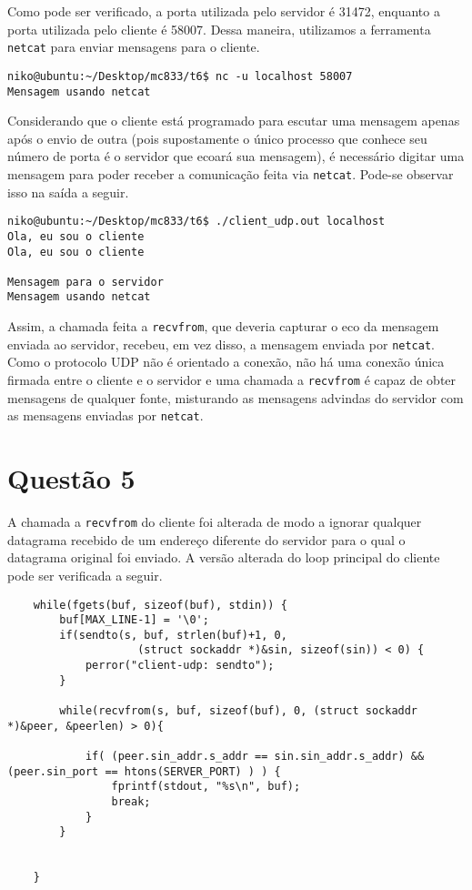 \documentclass[a4paper,10pt]{article}
\begin{document}
Como pode ser verificado, a porta utilizada pelo servidor é 31472, enquanto a porta utilizada pelo cliente é 58007. Dessa maneira, utilizamos a ferramenta {\tt netcat} para enviar mensagens para o cliente.

\begin{lstlisting}
niko@ubuntu:~/Desktop/mc833/t6$ nc -u localhost 58007
Mensagem usando netcat

\end{lstlisting}

Considerando que o cliente está programado para escutar uma mensagem apenas após o envio de outra (pois supostamente o único processo que conhece seu número de porta é o servidor que ecoará sua mensagem), é necessário digitar uma mensagem para poder receber a comunicação feita via {\tt netcat}. Pode-se observar isso na saída a seguir.

\begin{lstlisting}
niko@ubuntu:~/Desktop/mc833/t6$ ./client_udp.out localhost
Ola, eu sou o cliente
Ola, eu sou o cliente

Mensagem para o servidor
Mensagem usando netcat
\end{lstlisting}

Assim, a chamada feita a {\tt recvfrom}, que deveria capturar o eco da mensagem enviada ao servidor, recebeu, em vez disso, a mensagem enviada por {\tt netcat}. Como o protocolo UDP não é orientado a conexão, não há uma conexão única firmada entre o cliente e o servidor e uma chamada a {\tt recvfrom} é capaz de obter mensagens de qualquer fonte, misturando as mensagens advindas do servidor com as mensagens enviadas por {\tt netcat}.

\section{Questão 5}

A chamada a {\tt recvfrom} do cliente foi alterada de modo a ignorar qualquer datagrama recebido de um endereço diferente do servidor para o qual o datagrama original foi enviado. A versão alterada do loop principal do cliente pode ser verificada a seguir.

\begin{lstlisting}
    while(fgets(buf, sizeof(buf), stdin)) {
        buf[MAX_LINE-1] = '\0';
        if(sendto(s, buf, strlen(buf)+1, 0,
                    (struct sockaddr *)&sin, sizeof(sin)) < 0) {
            perror("client-udp: sendto");
        }
        
        while(recvfrom(s, buf, sizeof(buf), 0, (struct sockaddr *)&peer, &peerlen) > 0){

            if( (peer.sin_addr.s_addr == sin.sin_addr.s_addr) && (peer.sin_port == htons(SERVER_PORT) ) ) {
                fprintf(stdout, "%s\n", buf);
                break;
            }
        }

        
    }
\end{lstlisting}
\end{document}
